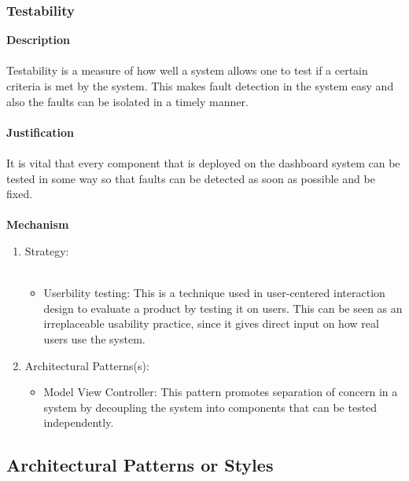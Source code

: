 			\subsubsection*{Testability}
			\textbf{Description}\\\\
			Testability is a measure of how well a system allows one to test if a certain criteria is met by the system. This makes fault detection in the system easy and also the faults can be isolated in a timely manner.\\\\
			\textbf{Justification}\\\\
			It is vital that every component that is deployed on the dashboard system can be tested in some way so that faults can be detected as soon as possible and be fixed. \\\\
			\textbf{Mechanism}
			\begin{enumerate}
				\item Strategy:\\\\
				\begin{itemize}
				\item Userbility testing: This is a technique used in user-centered interaction design to evaluate a product by testing it on users. This can be seen as an irreplaceable usability practice, since it gives direct input on how real users use the system.
				\end{itemize}
				\item Architectural Patterns(s):
				\begin{itemize}
				\item Model View Controller: This pattern promotes separation of concern in a system by decoupling the system into components that can be tested independently.   
				\end{itemize}
			\end{enumerate}	
    \newpage
    \subsection{Architectural Patterns or Styles}
